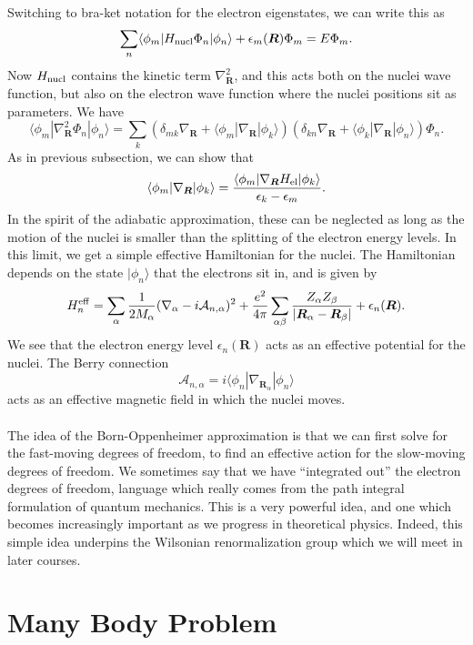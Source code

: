 Switching to bra-ket notation for the electron eigenstates, we can write this as
\[\sum_n \langle \phi_m | H_{\rm nucl} \Phi_n | \phi_n \rangle + \epsilon_m(\bm{R}) \Phi_m = E\Phi_m.\]
Now $H_{\rm nucl}$ contains the kinetic term $\nabla^2_{\bm{R}}$, and this acts both on the nuclei wave function, but also on the electron wave function where the nuclei positions sit as parameters. We have
\[\langle \phi_m | \nabla^2_{\bm{R}} \Phi_n | \phi_n \rangle = \sum_k \left(\delta_{mk} \nabla_{\bm{R}} + \langle \phi_m | \nabla_{\bm{R}} | \phi_k \rangle  \right) \left(\delta_{kn} \nabla_{\bm{R}} + \langle \phi_k | \nabla_{\bm{R}} | \phi_n \rangle  \right) \Phi_n.\]
As in previous subsection, we can show that
\[\langle \phi_m | \nabla_{\bm{R}} | \phi_k \rangle = \frac{\langle \phi_m | \nabla_{\bm{R}} H_{\rm el} | \phi_k\rangle}{\epsilon_k - \epsilon_m}.\]
In the spirit of the adiabatic approximation, these can be neglected as long as the motion of the nuclei is smaller than the splitting of the electron energy levels.
In this limit, we get a simple effective Hamiltonian for the nuclei. The Hamiltonian depends on the state $|\phi_n\rangle$ that the electrons sit in, and is given by
\[H_n^{\rm eff} = \sum_{\alpha} \frac{1}{2M_{\alpha}} (\nabla_{\alpha} - i\mathcal{A}_{n,\alpha})^2 + \frac{e^2}{4\pi}\sum_{\alpha \beta} \frac{Z_{\alpha} Z_{\beta}}{|\bm{R}_{\alpha} - \bm{R}_{\beta}|} + \epsilon_n(\bm{R}) .\]
We see that the electron energy level $\epsilon_n(\bm{R})$ acts as an effective potential for the nuclei. The Berry connection
\[\mathcal{A}_{n,\alpha} = i \langle \phi_n | \nabla_{\bm{R}_{\alpha}} | \phi_n \rangle\]
acts as an effective magnetic field in which the nuclei
moves.
\\ \\
The idea of the Born-Oppenheimer approximation is that we can first solve for the fast-moving degrees of freedom, to find an effective action for the slow-moving degrees
of freedom. We sometimes say that we have ``integrated out'' the electron degrees of freedom, language which really comes from the path integral formulation of quantum mechanics. 
This is a very powerful idea, and one which becomes increasingly important as we progress in theoretical physics. Indeed, this simple idea underpins the Wilsonian
renormalization group which we will meet in later courses.

\chapter{Many Body Problem}
